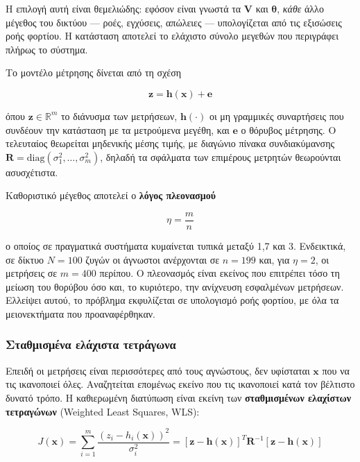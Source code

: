 Η επιλογή αυτή είναι θεμελιώδης: εφόσον είναι γνωστά τα $\mathbf{V}$ και
$\boldsymbol{\theta}$, \emph{κάθε} άλλο μέγεθος του δικτύου — ροές, εγχύσεις, απώλειες —
υπολογίζεται από τις εξισώσεις ροής φορτίου. Η κατάσταση αποτελεί το ελάχιστο σύνολο μεγεθών που
περιγράφει πλήρως το σύστημα.

Το μοντέλο μέτρησης δίνεται από τη σχέση

\begin{equation}
\mathbf{z} = \mathbf{h}(\mathbf{x}) + \mathbf{e}
\label{eq:measmodel}
\end{equation}

όπου $\mathbf{z} \in \mathbb{R}^{m}$ το διάνυσμα των μετρήσεων, $\mathbf{h}(\cdot)$ οι μη
γραμμικές συναρτήσεις που συνδέουν την κατάσταση με τα μετρούμενα μεγέθη, και $\mathbf{e}$
ο θόρυβος μέτρησης. Ο τελευταίος θεωρείται μηδενικής μέσης τιμής, με διαγώνιο πίνακα
συνδιακύμανσης $\mathbf{R} = \mathrm{diag}(\sigma_1^2, \ldots, \sigma_m^2)$, δηλαδή τα
σφάλματα των επιμέρους μετρητών θεωρούνται ασυσχέτιστα.

Καθοριστικό μέγεθος αποτελεί ο \textbf{λόγος πλεονασμού}

\begin{equation}
\eta = \frac{m}{n}
\label{eq:redundancy}
\end{equation}

ο οποίος σε πραγματικά συστήματα κυμαίνεται τυπικά μεταξύ 1,7 και 3. Ενδεικτικά, σε δίκτυο
$N = 100$ ζυγών οι άγνωστοι ανέρχονται σε $n = 199$ και, για $\eta = 2$, οι μετρήσεις σε
$m = 400$ περίπου. Ο πλεονασμός είναι εκείνος που επιτρέπει τόσο τη μείωση του θορύβου όσο
και, το κυριότερο, την ανίχνευση εσφαλμένων μετρήσεων. Ελλείψει αυτού, το πρόβλημα
εκφυλίζεται σε υπολογισμό ροής φορτίου, με όλα τα μειονεκτήματα που προαναφέρθηκαν.

\subsubsection*{Σταθμισμένα ελάχιστα τετράγωνα}

Επειδή οι μετρήσεις είναι περισσότερες από τους αγνώστους, δεν υφίσταται $\mathbf{x}$ που
να τις ικανοποιεί όλες. Αναζητείται επομένως εκείνο που τις ικανοποιεί κατά τον βέλτιστο
δυνατό τρόπο. Η καθιερωμένη διατύπωση είναι εκείνη των \textbf{σταθμισμένων ελαχίστων
τετραγώνων} (Weighted Least Squares, WLS):

\begin{equation}
J(\mathbf{x}) = \sum_{i=1}^{m} \frac{\left(z_i - h_i(\mathbf{x})\right)^2}{\sigma_i^2}
             = \left[\mathbf{z}-\mathbf{h}(\mathbf{x})\right]^{T} \mathbf{R}^{-1}
               \left[\mathbf{z}-\mathbf{h}(\mathbf{x})\right]
\label{eq:wls}
\end{equation}

